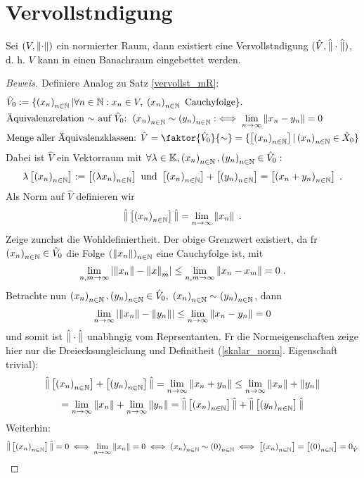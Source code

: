 \section{Vervollst\as ndigung}

\begin{theorem}
	Sei \((V,\norm\cdot)\) ein normierter Raum, dann existiert eine Vervollst\as ndigung \((\hat V, \hnorm\cdot)\), d. h. $V$ kann in einen Banachraum eingebettet werden.
\end{theorem}
\begin{proof}[Beweis] 
	Definiere Analog zu Satz \ref{vervollst_mR}:
	\begin{align*}
		&\hat V_0 := \{\seq x n \vert \forall n \in \N: x_n \in V, \; \seq x n \text{ Cauchyfolge}\}.\\
	&\text{\As quivalenzrelation $\sim$ auf $\hat V_0$: } 
	\seq xn \sim \seq yn :\iff \lim_{n\to\infty} \norm{x_n-y_n} = 0\\
	&\text{Menge aller \As quivalenzklassen: }
	\hat V = \faktor{\hat V_0}{\sim} = \{\equ{\seq xn} \vert \seq xn \in \hat X_0\} 
	\end{align*}
	Dabei ist \(\hat V\) ein Vektorraum mit \(\forall \lambda \in \K, \seq xn, \seq yn\in \hat V_0:\)
	\[\lambda \equ{\seq xn} := \equ{\seq{\lambda x}{n}}\text{ und } \equ{\seq xn} + \equ{\seq yn} = \equ{\se{x_n + y_n}{n}}\;.\]
	Als Norm auf \(\hat V\) definieren wir 
	\[\hnorm{\equ{\seq xn}} = \lime n \norm{x_n}\;.\]
	Zeige zun\as chst die Wohldefiniertheit. Der obige Grenzwert existiert, da f\us r \(\seq xn \in \hat V_0\) die Folge \(\se{\norm{x_n}}{n}\) eine Cauchyfolge ist, mit
	\[\lim_{n,m \to\infty} \ab{\norm{x_n} - \norm x_m} \leq \lim_{n,m\to\infty}\norm{x_n - x_m} = 0 \;.\]
	Betrachte nun \(\seq xn, \seq yn \in \hat V_0, \; \seq xn \sim \seq yn\), dann
	\[\lime n\ab{\norm{x_n} - \norm{y_n}} \leq \lime n \norm{x_n -y_n}  = 0 \]
	und somit ist \(\hnorm \cdot\) unabh\as ngig vom Repr\as sentanten. F\us r die Normeigenschaften zeige hier nur die Dreiecksungleichung und Definitheit (\ref{skalar_norm}. Eigenschaft trivial):
	\begin{multline*}\hnorm{\equ{\seq xn} + \equ{\seq yn}} = \lime n \norm{x_n + y_n} \leq \lime n \norm{x_n} + \norm{y_n} \\= \lime n \norm{x_n} + \lime n \norm{y_n} = \hnorm{\equ{\seq xn}} + \hnorm{ \equ{\seq yn}}\end{multline*}
	Weiterhin:
		\[\hnorm{\equ{\seq xn}} = 0 \iff \lime n \norm{x_n} = 0 \iff \seq xn \sim \se{0}{n} \iff \equ{\seq xn} = \equ{\se{0}{n}} = 0_{\hat V}\]
\end{proof}


